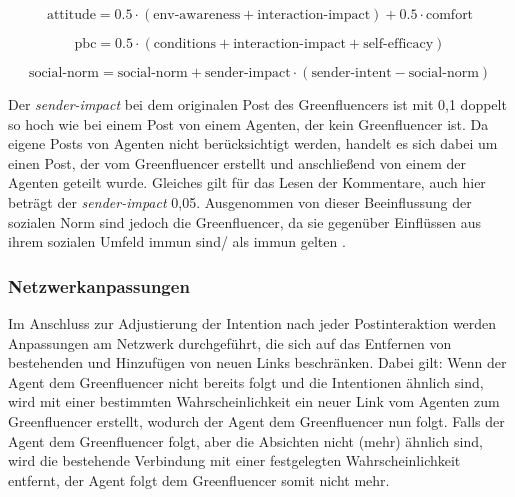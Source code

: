 \documentclass[runningheads]{llncs}
\begin{document}
\begin{equation}
  \text{attitude} = 0.5 \cdot (\text{env-awareness} + \text{interaction-impact}) 
  + 0.5 \cdot \text{comfort}
  \label{eq:attitude}
\end{equation}

\begin{equation}
  \text{pbc} = 0.5 \cdot (\text{conditions} + \text{interaction-impact} + \text{self-efficacy})
  \label{eq:pbc}
\end{equation}

\begin{equation}
  \text{social-norm} = \text{social-norm} + \text{sender-impact} \cdot (\text{sender-intent} - \text{social-norm})
  \label{eq:social-norm}
\end{equation}

Der \textit{sender-impact} bei dem originalen Post des Greenfluencers ist mit 0,1 doppelt so hoch wie bei einem Post von einem Agenten, der kein Greenfluencer ist. Da eigene Posts von Agenten nicht berücksichtigt werden, handelt es sich dabei um einen Post, der vom Greenfluencer erstellt und anschließend von einem der Agenten geteilt wurde. Gleiches gilt für das Lesen der Kommentare, auch hier beträgt der \textit{sender-impact} 0,05. Ausgenommen von dieser Beeinflussung der sozialen Norm sind jedoch die Greenfluencer, da sie gegenüber Einflüssen aus ihrem sozialen Umfeld immun sind/ als immun gelten \cite{schwarz_agent-based_2009,kaufmann_simulating_2009}.

\subsubsection{Netzwerkanpassungen}
Im Anschluss zur Adjustierung der Intention nach jeder Postinteraktion werden Anpassungen am Netzwerk durchgeführt, die sich auf das Entfernen von bestehenden und Hinzufügen von neuen Links beschränken. Dabei gilt: Wenn der Agent dem Greenfluencer nicht bereits folgt und die Intentionen ähnlich sind, wird mit einer bestimmten Wahrscheinlichkeit ein neuer Link vom Agenten zum Greenfluencer erstellt, wodurch der Agent dem Greenfluencer nun folgt. Falls der Agent dem Greenfluencer folgt, aber die Absichten nicht (mehr) ähnlich sind, wird die bestehende Verbindung mit einer festgelegten Wahrscheinlichkeit entfernt, der Agent folgt dem Greenfluencer somit nicht mehr.
\end{document}
